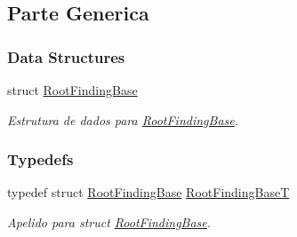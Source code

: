 \hypertarget{group____roots}{
\subsection{Parte Generica}
\label{group____roots}
}
\subsubsection*{Data Structures}
\begin{CompactItemize}
\item 
struct \hyperlink{structRootFindingBase}{RootFindingBase}
\begin{CompactList}\small\item\em Estrutura de dados para \hyperlink{structRootFindingBase}{RootFindingBase}. \item\end{CompactList}\end{CompactItemize}
\subsubsection*{Typedefs}
\begin{CompactItemize}
\item 
typedef struct \hyperlink{structRootFindingBase}{RootFindingBase} \hyperlink{group____roots_gdb81038cc3cdc5d4af8be9fe0c45f11a}{RootFindingBaseT}
\begin{CompactList}\small\item\em Apelido para struct \hyperlink{structRootFindingBase}{RootFindingBase}. \item\end{CompactList}\end{CompactItemize}
